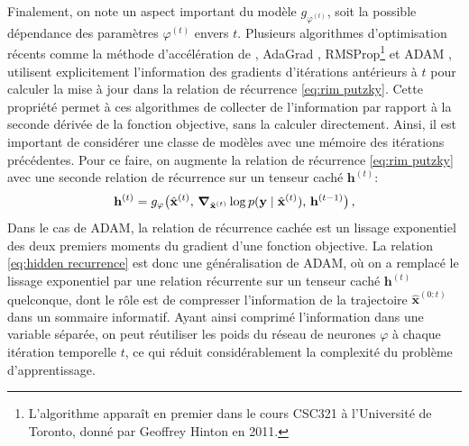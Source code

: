 Finalement, on note un aspect important du modèle $g_{\varphi^{(t)}}$, soit la possible dépendance des paramètres $\varphi^{(t)}$ envers $t$. Plusieurs 
algorithmes d'optimisation récents comme la méthode d'accélération de \citet{Nesterov1983}, 
AdaGrad \citep{Duchi2011}, RMSProp\footnote{L'algorithme apparaît en premier dans le cours CSC321 à l'Université de Toronto, donné par Geoffrey Hinton en 2011.} \citep{Hinton2012} 
et ADAM \citep{Kingma2014},
utilisent explicitement l'information 
des gradients d'itérations antérieurs à $t$ pour calculer la mise à jour dans la relation de récurrence \eqref{eq:rim putzky}.
Cette propriété permet à ces algorithmes de collecter de l'information par rapport à la seconde dérivée de la fonction 
objective, sans la calculer directement.
Ainsi, il est important de considérer une classe de modèles avec une mémoire des itérations précédentes. 
Pour ce faire, on augmente la relation de récurrence \eqref{eq:rim putzky} avec une seconde relation de 
récurrence sur un tenseur caché $\mathbf{h}^{(t)}$:
\begin{equation}\label{eq:hidden recurrence}
        \mathbf{h}^{(t)} = g_{\varphi}\big(\hat{\mathbf{x}}^{(t)},\, \grad_{\hat{\mathbf{x}}^{(t)}} \log p(\mathbf{y} \mid \hat{\mathbf{x}}^{(t)}),\,  \mathbf{h}^{(t-1)}\big)\, ,
\end{equation} 
Dans le cas de ADAM, la relation de récurrence cachée est un lissage exponentiel des deux premiers 
moments du gradient d'une fonction objective.
La relation \eqref{eq:hidden recurrence} est donc une généralisation de ADAM, 
où on a remplacé le lissage exponentiel par une relation récurrente sur un tenseur caché $\mathbf{h}^{(t)}$ quelconque, 
dont le rôle est de compresser l'information de 
la trajectoire $\hat{\mathbf{x}}^{(0:t)}$ dans un sommaire informatif. Ayant ainsi comprimé l'information dans une variable 
séparée, on peut réutiliser les poids du réseau de neurones $\varphi$ à chaque itération temporelle $t$, ce 
qui réduit considérablement la complexité du problème d'apprentissage.


